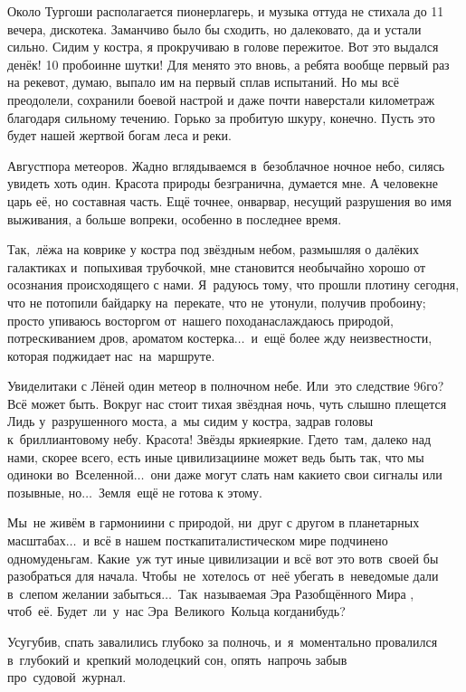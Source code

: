 Около Тургоши располагается пионерлагерь, и музыка оттуда не стихала до 11 вечера, дискотека. Заманчиво было бы сходить, но далековато, да и устали сильно. Сидим у костра, я прокручиваю в голове пережитое. Вот это выдался денёк! 10 пробоин\mdash не шутки! Для меня\sdash то это вновь, а ребята вообще первый раз на реке\mdash вот, думаю, выпало им на первый сплав испытаний. Но мы всё преодолели, сохранили боевой настрой и даже почти наверстали километраж благодаря сильному течению. Горько за пробитую шкуру, конечно. Пусть это будет нашей жертвой богам леса и реки.

Август\mdash пора метеоров. Жадно вглядываемся в~безоблачное ночное небо, силясь увидеть хоть один. Красота природы безгранична, думается мне. А человек\mdash не царь её, но составная часть. Ещё точнее, он\mdash варвар, несущий разрушения во имя выживания, а больше вопреки, особенно в последнее время. 

Так,~лёжа на коврике у костра под звёздным небом, размышляя о далёких галактиках и~попыхивая трубочкой, мне становится необычайно хорошо от осознания происходящего с нами. Я~радуюсь тому, что прошли плотину сегодня, что не потопили байдарку на~перекате, что не~утонули, получив пробоину; просто упиваюсь восторгом от~нашего похода\mdash наслаждаюсь природой, потрескиванием дров, ароматом костерка$\ldots$~и~ещё более жду неизвестности, которая поджидает нас~на~маршруте.

Увидели\sdash таки с Лёней один метеор в полночном небе. Или~это следствие 96\sdash го? Всё может быть. Вокруг нас стоит тихая звёздная ночь, чуть слышно плещется Лидь у~разрушенного моста, а~мы сидим у костра, задрав головы к~бриллиантовому небу. Красота! Звёзды яркие\sdash яркие. Где\sdash то~там, далеко над нами, скорее всего, есть иные цивилизации\mdash не может ведь быть так, что мы одиноки во~Вселенной$\ldots$~они даже могут слать нам какие\sdash то свои сигналы или позывные, но$\ldots$~Земля~ещё не готова к этому. 

Мы~не живём в гармонии\mdash ни с природой, ни~друг с другом в планетарных масштабах$\ldots$~и всё в нашем посткапиталистическом мире подчинено одному\mdash деньгам. Какие~уж тут иные цивилизации и всё вот это вот\mdash в~своей бы разобраться для начала. Чтобы~не~хотелось от~неё убегать в~неведомые дали в~слепом желании забыться$\ldots$~Так~называемая Эра Разобщённого Мира \cite{ТуманностьАндромеды}, чтоб~её. Будет~ли~у~нас Эра~Великого~Кольца когда\sdash нибудь?

Усугубив, спать завалились глубоко за полночь, и~я~моментально провалился в~глубокий и~крепкий молодецкий сон, опять~напрочь забыв про~судовой~журнал.

\begin{center}
\end{center}